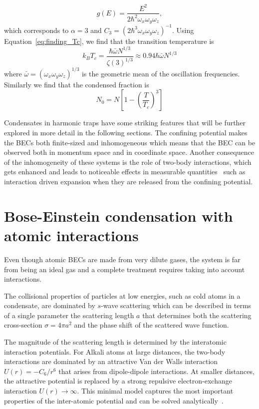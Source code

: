 \begin{equation}
	g(E)=\frac{E^2}{2\hbar^2\omega_x\omega_y\omega_z},
\end{equation}
%
which corresponds to $\alpha=3$ and $C_3=(2\hbar^3\omega_x\omega_y\omega_z)^{-1}$. Using Equation~\ref{eq:finding_Tc}, we find that the transition temperature is
%
\begin{equation}
 	k_B T_c=\frac{\hbar \bar{\omega}N^{1/3}}{\zeta(3)^{1/3}}\approx0.94\hbar\bar{\omega}N^{1/3}
 \end{equation} 
%
where $\bar{\omega}=(\omega_x\omega_y\omega_z)^{1/3}$ is the geometric mean of the oscillation frequencies. Similarly we find that the condensed fraction is
%
\begin{equation}
	N_0=N\left[1-\left(\frac{T}{T_c}\right)^3\right]
\end{equation}

Condensates in harmonic traps have some striking features that will be further explored in more detail in the following sections. The confining potential makes the BECs both finite-sized and inhomogeneous which means that the BEC can be observed both in momentum space and in coordinate space. Another consequence of the inhomogeneity of these systems is the role of two-body interactions, which gets enhanced and leads to noticeable effects in measurable quantities~\cite{dalfovo_theory_1999,castin_bose-einstein_1996} such as interaction driven expansion when they are released from the confining potential. %

\section{Bose-Einstein condensation with atomic interactions}

Even though atomic BECs are made from very dilute gases, the system is far from being an ideal gas and a complete treatment requires taking into account interactions.

The collisional properties of particles at low energies, such as cold atoms in a condensate, are dominated by $s$-wave scattering which can be described in terms of a single parameter the scattering length $a$ that determines both the scattering cross-section $\sigma=4\pi a^2$ and the phase shift of the scattered wave function. 

The magnitude of the scattering length is determined by the interatomic interaction potentials. For Alkali atoms at large distances, the two-body interactions are dominated by an attractive Van der Walls interaction $U(r)=-C_6/r^6$ that arises from dipole-dipole interactions. At smaller distances, the attractive potential is replaced by a strong repulsive electron-exchange interaction $U(r)\rightarrow\infty$. This minimal model captures the most important properties of the inter-atomic potential and can be solved analytically~\cite{gribakin_calculation_1993}. 


